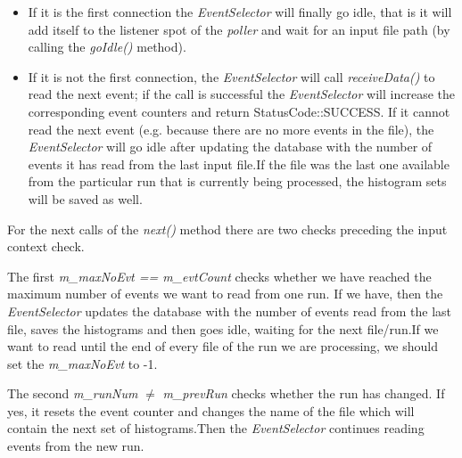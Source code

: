 \begin{itemize}
\item If it is the first connection the \textit{EventSelector} will finally go idle, that is it will add itself to the listener spot of the \textit{poller} and wait for an input file path (by calling the \textit{goIdle()} method).\par
\item If it is not the first connection, the \textit{EventSelector} will call \textit{receiveData()} to read the next event; if the call is successful the \textit{EventSelector} will increase the corresponding event counters and return StatusCode::SUCCESS. If it cannot read the next event (e.g. because there are no more events in the file), the \textit{EventSelector} will go idle after updating the database with the number of events it has read from the last input file.If the file was the last one available from the particular run that is currently being processed, the histogram sets will be saved as well.\par
\end{itemize}
For the next calls of the  \textit{next()} method there are two checks preceding the input context check.\par
The first \textit{m\_maxNoEvt == m\_evtCount} checks whether we have reached the maximum number of events we want to read from one run. If we have, then the \textit{EventSelector} updates the database with the number of events read from the last file, saves the histograms and then goes idle, waiting for the next file/run.If we want to read until the end of every file of the run we are processing, we should set the \textit{m\_maxNoEvt} to -1.\par
The second \textit{m\_runNum} $\neq$ \textit{m\_prevRun} checks whether the run has changed. If yes, it resets the event counter and changes the name of the file which will contain the next set of histograms.Then the \textit{EventSelector} continues reading events from the new run.\par
